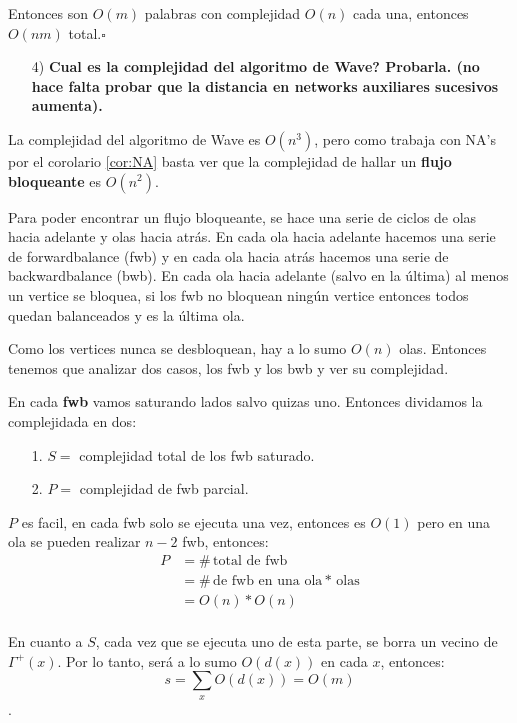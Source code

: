 \documentclass[12pt,a4paper]{article}
\begin{document}
Entonces son $O(m)$ palabras con complejidad $O(n)$ cada una, entonces $O(nm)$ 
total.$\square$

\begin{itemize}
    \item [4)] \textbf{Cual es la complejidad del algoritmo de Wave? Probarla. 
    (no hace falta probar que la distancia en networks auxiliares sucesivos 
    aumenta).}
    \label{dem:Wave}
\end{itemize}

La complejidad del algoritmo de Wave es $O(n^{3})$, pero como trabaja con NA's 
por el corolario \ref{cor:NA} basta ver que la complejidad de hallar un
\textbf{flujo bloqueante} es $O(n^{2})$.
\medskip

Para poder encontrar un flujo bloqueante, se hace una serie de ciclos de olas 
hacia adelante y olas hacia atrás. En cada ola hacia adelante hacemos una serie 
de forwardbalance (fwb) y en cada ola hacia atrás hacemos una serie de
backwardbalance (bwb). En cada ola hacia adelante (salvo en la última) al menos 
un vertice se bloquea, si los fwb no bloquean ningún vertice entonces todos 
quedan balanceados y es la última ola.
\medskip

Como los vertices nunca se desbloquean, hay a lo sumo $O(n)$ olas. Entonces tenemos 
que analizar dos casos, los fwb y los bwb y ver su complejidad. 
\medskip

En cada \textbf{fwb} vamos saturando lados salvo quizas uno. Entonces dividamos la 
complejidada en dos:
\begin{itemize}
    \item [1.] $S=$ complejidad total de los fwb saturado.
    \item [2.] $P=$ complejidad de fwb parcial.
\end{itemize}

$P$ es facil, en cada fwb solo se ejecuta una vez, entonces es $O(1)$ pero en una 
ola se pueden realizar $n-2$ fwb, entonces:
\begin{align*}
    P &= \#\,\text{total de fwb}\\
    &= \#\,\text{de fwb en una ola} * \,\text{olas}\\
    &= O(n) * O(n)\\
\end{align*}

En cuanto a $S$, cada vez que se ejecuta uno de esta parte, se borra un vecino de 
$\Gamma^{+}(x)$. Por lo tanto, será a lo sumo $O(d(x))$ en cada $x$, entonces:
$$s = \sum_{x} O(d(x)) = O(m)$$.
\medskip
\end{document}
